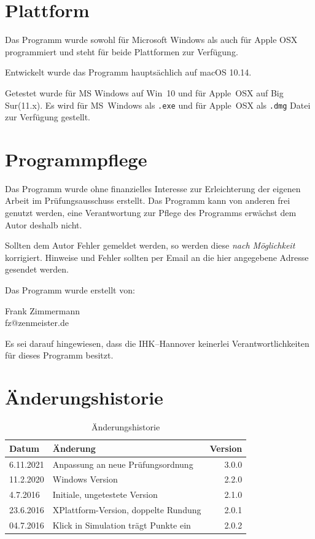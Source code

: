 \documentclass[a4paper,notitlepage,parskip=half]{scrartcl}
\begin{document}
\section{Plattform}
Das Programm wurde sowohl für Microsoft Windows als auch für Apple OSX programmiert und steht für beide Plattformen zur Verfügung. 

Entwickelt wurde das Programm hauptsächlich auf macOS 10.14.

Getestet  wurde für MS Windows auf Win~10 und für Apple~OSX auf Big Sur(11.x).
Es wird für MS~Windows als \texttt{.exe} und für Apple~OSX als \texttt{.dmg} Datei zur Verfügung gestellt. 

\section{Programmpflege}
Das Programm wurde ohne finanzielles Interesse zur Erleichterung der eigenen Arbeit im Prüfungsausschuss erstellt.
Das Programm kann von anderen frei genutzt werden, eine Verantwortung zur Pflege des Programms erwächst dem Autor deshalb nicht.

Sollten dem Autor Fehler gemeldet werden, so werden diese \emph{nach Möglichkeit} korrigiert. Hinweise und Fehler sollten per Email an die hier angegebene Adresse gesendet werden.

Das Programm wurde erstellt von:

Frank Zimmermann\\
fz@zenmeister.de

Es sei darauf hingewiesen, dass die IHK--Hannover keinerlei Verantwortlichkeiten für dieses Programm besitzt.
\section{Änderungshistorie}
\begin{table}[H]\centering
\begin{tabular}{|l|l|r|}
\hline
Datum & Änderung &Version\\
\hline
6.11.2021&	Anpassung an neue Prüfungsordnung	&  3.0.0\\
11.2.2020&	Windows Version						&  2.2.0\\
4.7.2016&	Initiale, ungetestete Version		&  2.1.0\\
23.6.2016&	XPlattform-Version, doppelte Rundung&  2.0.1\\
04.7.2016&	Klick in Simulation trägt Punkte ein&  2.0.2\\
\hline
\end{tabular}
\caption{Änderungshistorie}
\end{table}
\end{document}
